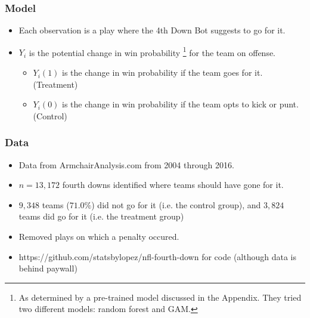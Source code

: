\documentclass[t]{beamer}
\begin{document}
\begin{frame}
  \frametitle{Model}
  \begin{itemize}
  \item Each observation is a play where the 4th Down Bot suggests to go for it.
  \item $Y_i$ is the potential change in win probability \footnote{As determined by a pre-trained model discussed in the Appendix. They tried two different models: random forest and GAM.} for the team on offense.
    \begin{itemize}
    \item $Y_i(1)$ is the change in win probability if the team goes for it. (Treatment)
    \item $Y_i(0)$ is the change in win probability if the team opts to kick or punt. (Control)
    \end{itemize}
  \end{itemize}
\end{frame}


\begin{frame}
  \frametitle{Data}
  \begin{itemize}
  \item Data from ArmchairAnalysis.com from 2004 through 2016.
  \item $n=13,172$ fourth downs identified where teams should have gone for it.
  \item $9,348$ teams ($71.0\%$) did not go for it (i.e. the control group), and $3,824$ teams did go for it (i.e. the treatment group)
  \item Removed plays on which a penalty occured.
  \item https://github.com/statsbylopez/nfl-fourth-down for code (although data is behind paywall)
  \end{itemize}
\end{frame}
\end{document}
